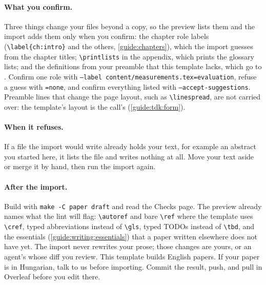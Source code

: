 \paragraph{What you confirm.} Three things change your files beyond a copy, so the preview lists them and the import adds them only when you confirm: the chapter role labels (\texttt{\textbackslash label\{ch:intro\}} and the others, \cref{guide:chapters}), which the import guesses from the chapter titles; \texttt{\textbackslash printlists} in the appendix, which prints the glossary lists; and the definitions from your preamble that this template lacks, which go to . Confirm one role with \texttt{--label content/measurements.tex=evaluation}, refuse a guess with \texttt{=none}, and confirm everything listed with \texttt{--accept-suggestions}. Preamble lines that change the page layout, such as \texttt{\textbackslash linespread}, are not carried over: the template's layout is the call's (\cref{guide:tdk:form}).

\paragraph{When it refuses.} If a file the import would write already holds your text, for example an abstract you started here, it lists the file and writes nothing at all. Move your text aside or merge it by hand, then run the import again.

\paragraph{After the import.} Build with \texttt{make -C paper draft} and read the Checks page. The preview already names what the lint will flag: \texttt{\textbackslash autoref} and bare \texttt{\textbackslash ref} where the template uses \texttt{\textbackslash cref}, typed abbreviations instead of \texttt{\textbackslash gls}, typed TODOs instead of \texttt{\textbackslash tbd}, and the essentials (\cref{guide:writing:essentials}) that a paper written elsewhere does not have yet. The import never rewrites your prose; those changes are yours, or an agent's whose diff you review. This template builds English papers. If your paper is in Hungarian, talk to us before importing. Commit the result, push, and pull in Overleaf before you edit there.
